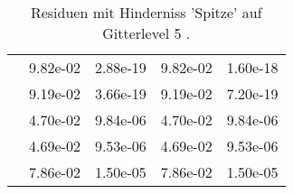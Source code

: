\begin{table}
\begin{tabular}{c|cc|cc|}
\multicolumn{1}{|c|}{} & \multicolumn{1}{|c|}{  9.82e-02} & \multicolumn{1}{|c|}{  2.88e-19} & \multicolumn{1}{|c|}{  9.82e-02} & \multicolumn{1}{|c|}{  1.60e-18} \\ 
\multicolumn{1}{|c|}{} & \multicolumn{1}{|c|}{  9.19e-02} & \multicolumn{1}{|c|}{  3.66e-19} & \multicolumn{1}{|c|}{  9.19e-02} & \multicolumn{1}{|c|}{  7.20e-19} \\ 
\multicolumn{1}{|c|}{} & \multicolumn{1}{|c|}{  4.70e-02} & \multicolumn{1}{|c|}{  9.84e-06} & \multicolumn{1}{|c|}{  4.70e-02} & \multicolumn{1}{|c|}{  9.84e-06} \\ 
\multicolumn{1}{|c|}{} & \multicolumn{1}{|c|}{  4.69e-02} & \multicolumn{1}{|c|}{  9.53e-06} & \multicolumn{1}{|c|}{  4.69e-02} & \multicolumn{1}{|c|}{  9.53e-06} \\ 
\multicolumn{1}{|c|}{} & \multicolumn{1}{|c|}{  7.86e-02} & \multicolumn{1}{|c|}{  1.50e-05} & \multicolumn{1}{|c|}{  7.86e-02} & \multicolumn{1}{|c|}{  1.50e-05} \\ 
\hline 
\end{tabular}\caption{Residuen mit Hinderniss 'Spitze' auf Gitterlevel 5 .}\label{tab:Residuum_Spitze_level5}
\end{table} 
